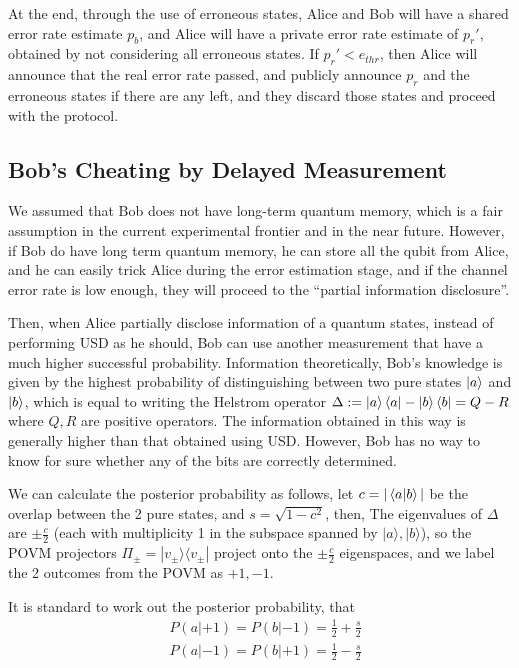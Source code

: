 \documentclass[%
 reprint,
superscriptaddress,
 amsmath,amssymb,
 aps,
]{revtex4-2}
\begin{document}
At the end, through the use of erroneous states, Alice and Bob will have a shared error rate estimate $p_b$, and Alice will have a private error rate estimate of $p_r'$, obtained by not considering all erroneous states. If $p_r'<e_{thr}$, then Alice will announce that the real error rate passed, and publicly announce $p_r$ and the erroneous states if there are any left, and they discard those states and proceed with the protocol.

\subsection{Bob's Cheating by Delayed Measurement}

We assumed that Bob does not have long-term quantum memory, which is a fair assumption in the current experimental frontier and in the near future. However, if Bob do have long term quantum memory, he can store all the qubit from Alice, and he can easily trick Alice during the error estimation stage, and if the channel error rate is low enough, they will proceed to the ``partial information disclosure''.

Then, when Alice partially disclose information of a quantum states, instead of performing USD as he should, Bob can use another measurement that have a much higher successful probability. Information theoretically, Bob's knowledge is given by the highest probability of distinguishing between two pure states $\ket{a}$ and $\ket{b}$, which is equal to writing the Helstrom operator $\Delta:=\ket{a}\bra{a} - \ket{b}\bra{b} = Q - R$ where $Q, R$ are positive operators. The information obtained in this way is generally higher than that obtained using USD. However, Bob has no way to know for sure whether any of the bits are correctly determined. 

We can calculate the posterior probability as follows, let $c=|\bra{a}\ket{b}|$ be the overlap between the 2 pure states, and $s=\sqrt{1-c^2}$, then, The eigenvalues of $\Delta$ are $\pm\frac{c}{2}$ (each with multiplicity 1 in the subspace spanned by $|a\rangle, |b\rangle$), so the POVM projectors $\Pi_{\pm} = |v_\pm\rangle\langle v_\pm|$ project onto the $\pm\frac{c}{2}$ eigenspaces, and we label the 2 outcomes from the POVM as $+1, -1$.

It is standard to work out the posterior probability, that
\begin{equation}
\begin{split}
    &P(a|+1) = P(b|-1)=\frac{1}{2}+\frac{s}{2}\\
    &P(a|-1) = P(b|+1)=\frac{1}{2}-\frac{s}{2}
\end{split}
\end{equation}
\end{document}
